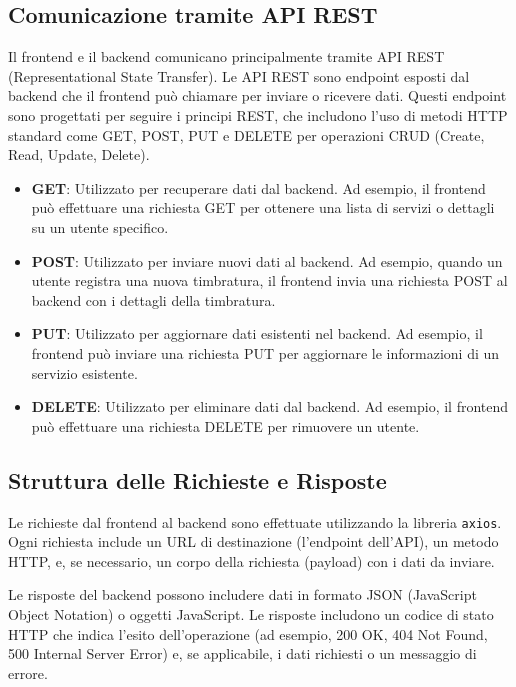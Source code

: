 \documentclass[twoside]{supsistudent}
\begin{document}
\subsection{Comunicazione tramite API REST}

Il frontend e il backend comunicano principalmente tramite API REST (Representational State Transfer). Le API REST sono endpoint esposti dal backend che il frontend può chiamare per inviare o ricevere dati. Questi endpoint sono progettati per seguire i principi REST, che includono l'uso di metodi HTTP standard come GET, POST, PUT e DELETE per operazioni CRUD (Create, Read, Update, Delete).

\begin{itemize}
  \item \textbf{GET}: Utilizzato per recuperare dati dal backend. Ad esempio, il frontend può effettuare una richiesta GET per ottenere una lista di servizi o dettagli su un utente specifico.
  \item \textbf{POST}: Utilizzato per inviare nuovi dati al backend. Ad esempio, quando un utente registra una nuova timbratura, il frontend invia una richiesta POST al backend con i dettagli della timbratura.
  \item \textbf{PUT}: Utilizzato per aggiornare dati esistenti nel backend. Ad esempio, il frontend può inviare una richiesta PUT per aggiornare le informazioni di un servizio esistente.
  \item \textbf{DELETE}: Utilizzato per eliminare dati dal backend. Ad esempio, il frontend può effettuare una richiesta DELETE per rimuovere un utente.
\end{itemize}

\subsection{Struttura delle Richieste e Risposte}

Le richieste dal frontend al backend sono effettuate utilizzando la libreria \texttt{axios}. Ogni richiesta include un URL di destinazione (l'endpoint dell'API), un metodo HTTP, e, se necessario, un corpo della richiesta (payload) con i dati da inviare.

Le risposte del backend possono includere dati in formato JSON (JavaScript Object Notation) o oggetti JavaScript. Le risposte includono un codice di stato HTTP che indica l'esito dell'operazione (ad esempio, 200 OK, 404 Not Found, 500 Internal Server Error) e, se applicabile, i dati richiesti o un messaggio di errore.
\end{document}
